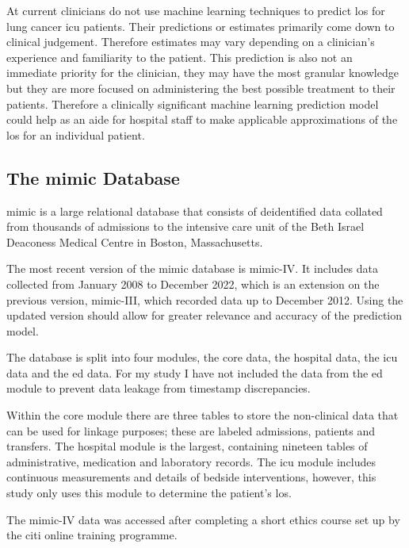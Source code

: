 \documentclass[11pt]{article}
\begin{document}
At current clinicians do not use machine learning techniques to predict \gls{los} for lung cancer \gls{icu} patients. Their predictions or estimates primarily come down to clinical judgement. Therefore estimates may vary depending on a clinician's experience and familiarity to the patient. This prediction is also not an immediate priority for the clinician, they may have the most granular knowledge but they are more focused on administering the best possible treatment to their patients. Therefore a clinically significant machine learning prediction model could help as an aide for hospital staff to make applicable approximations of the \gls{los} for an individual patient\cite{DosSantos2025}.

\subsection{The \gls{mimic} Database}
\gls{mimic} is a large relational database that consists of deidentified data collated from thousands of admissions to the intensive care unit of the Beth Israel Deaconess Medical Centre in Boston, Massachusetts\cite{physionetMIMICIVV31}. 

The most recent version of the \gls{mimic} database is \gls{mimic}-IV. It includes data collected from January 2008 to December 2022, which is an extension on the previous version, \gls{mimic}-III, which recorded data up to December 2012. Using the updated version should allow for greater relevance and accuracy of the prediction model.

The database is split into four modules, the core data, the hospital data, the \gls{icu} data and the \gls{ed} data. For my study I have not included the data from the \gls{ed} module to prevent data leakage from timestamp discrepancies.

Within the core module there are three tables to store the non-clinical data that can be used for linkage purposes; these are labeled admissions, patients and transfers. The hospital module is the largest, containing nineteen tables of administrative, medication and laboratory records. The \gls{icu} module includes continuous measurements and details of bedside interventions, however, this study only uses this module to determine the patient's \gls{los}.

The \gls{mimic}-IV data was accessed after completing a short ethics course set up by the \gls{citi} online training programme\cite{physionetCITICourse}\cite{citiprogramTechEthics}.
\end{document}
